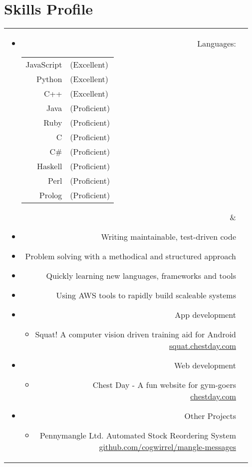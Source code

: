 \section*{Skills Profile}

\begin{tabular}{rl}

\parbox[t]{0.3\textwidth}{
	\begin{itemize}
		\item Languages:
		\begin{tabular}[h]{rl}
			JavaScript & (Excellent)\\
			Python & (Excellent)\\
			C++ & (Excellent)\\
			Java & (Proficient)\\
			Ruby & (Proficient)\\
			C & (Proficient)\\
			C\# & (Proficient)\\
			Haskell & (Proficient)\\
			Perl & (Proficient)\\
			Prolog & (Proficient)
		\end{tabular}
	\end{itemize}}
&
\parbox[t]{0.6\textwidth}{
	\begin{itemize}
		\item Writing maintainable, test-driven code
		\item Problem solving with a methodical and structured approach
		\item Quickly learning new languages, frameworks and tools
		\item Using AWS tools to rapidly build scaleable systems
		\item App development
			\begin{itemize}
				\item Squat! A computer vision driven training aid for Android\\
				\url{squat.chestday.com}
			\end{itemize}
		\item Web development
			\begin{itemize}
				\item Chest Day - A fun website for gym-goers\\
				\url{chestday.com}
			\end{itemize}
		\item Other Projects
			\begin{itemize}
				\item Pennymangle Ltd. Automated Stock Reordering System\\
				\url{github.com/cogwirrel/mangle-messages}
			\end{itemize}
	\end{itemize}}\\

\end{tabular}

